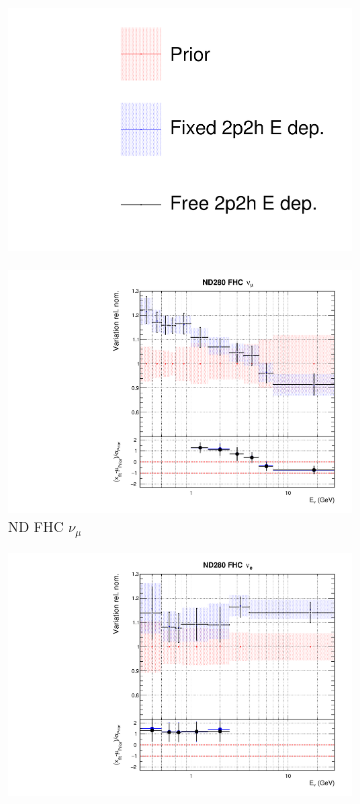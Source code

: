 \begin{figure}
\centering
\begin{subfigure}{0.95\textwidth}
  \centering
  \includegraphics[width=0.24\linewidth]{figs/fixed2p2hfits_leg}
\end{subfigure}
\begin{subfigure}{0.24\textwidth}
  \centering
  \includegraphics[width=0.95\linewidth]{figs/fixed2p2hflux0}
  \caption{ND FHC $\nu_{\mu}$}
\end{subfigure}
\begin{subfigure}{0.24\textwidth}
  \centering
  \includegraphics[width=0.95\linewidth]{figs/fixed2p2hflux1}

\end{subfigure}
\end{figure}
